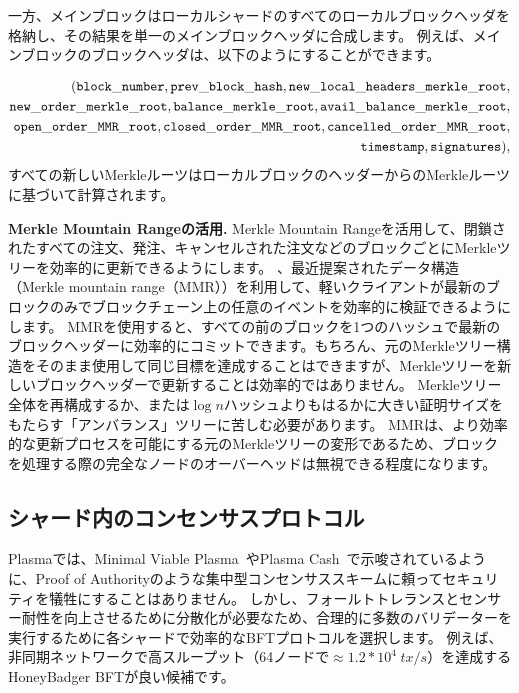 一方、メインブロックはローカルシャードのすべてのローカルブロックヘッダを格納し、その結果を単一のメインブロックヘッダに合成します。 例えば、メインブロックのブロックヘッダは、以下のようにすることができます。

\begin{align*}
({\mathtt{block\_number}}, {\mathtt{prev\_block\_hash}}, {\mathtt{new\_local\_headers\_merkle\_root}}, \\ {\mathtt{new\_order\_merkle\_root}}, {\mathtt{balance\_merkle\_root}}, {\mathtt{avail\_balance\_merkle\_root}}, \\ {\mathtt{open\_order\_MMR\_root}}, {\mathtt{closed\_order\_MMR\_root}}, {\mathtt{cancelled\_order\_MMR\_root}},\\ {\mathtt{timestamp}}, {\mathtt{signatures}}),
\end{align*}
すべての新しいMerkleルーツはローカルブロックのヘッダーからのMerkleルーツに基づいて計算されます。

\textbf{Merkle Mountain Rangeの活用.}  Merkle Mountain Rangeを活用して、閉鎖されたすべての注文、発注、キャンセルされた注文などのブロックごとにMerkleツリーを効率的に更新できるようにします。 、最近提案されたデータ構造（Merkle mountain range（MMR））を利用して、軽いクライアントが最新のブロックのみでブロックチェーン上の任意のイベントを効率的に検証できるようにします。
MMRを使用すると、すべての前のブロックを1つのハッシュで最新のブロックヘッダーに効率的にコミットできます。もちろん、元のMerkleツリー構造をそのまま使用して同じ目標を達成することはできますが、Merkleツリーを新しいブロックヘッダーで更新することは効率的ではありません。 Merkleツリー全体を再構成するか、または$\log{n}$ハッシュよりもはるかに大きい証明サイズをもたらす「アンバランス」ツリーに苦しむ必要があります。 MMRは、より効率的な更新プロセスを可能にする元のMerkleツリーの変形であるため、ブロックを処理する際の完全なノードのオーバーヘッドは無視できる程度になります。

\subsection{シャード内のコンセンサスプロトコル}\label{shard-consensus}
Plasmaでは、Minimal Viable Plasma~\cite{plasma-mvp}やPlasma Cash~\cite{plasma-cash}で示唆されているように、Proof of Authorityのような集中型コンセンサススキームに頼ってセキュリティを犠牲にすることはありません。 しかし、フォールトトレランスとセンサー耐性を向上させるために分散化が必要なため、合理的に多数のバリデーターを実行するために各シャードで効率的なBFTプロトコルを選択します。 例えば、非同期ネットワークで高スループット（64ノードで$\approx 1.2*10^4\hspace{3pt} tx/s$）を達成するHoneyBadger BFT\cite{honeybadger}が良い候補です。

